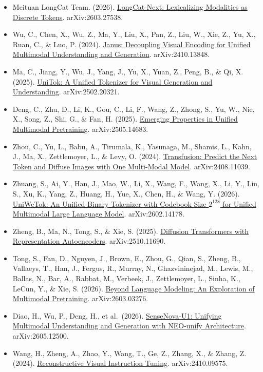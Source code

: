 \begin{itemize}
\tightlist
\item
  Meituan LongCat Team. (2026). \href{https://arxiv.org/abs/2603.27538}{LongCat-Next: Lexicalizing Modalities as Discrete Tokens}. arXiv:2603.27538.
\item
  Wu, C., Chen, X., Wu, Z., Ma, Y., Liu, X., Pan, Z., Liu, W., Xie, Z., Yu, X., Ruan, C., \& Luo, P. (2024). \href{https://arxiv.org/abs/2410.13848}{Janus: Decoupling Visual Encoding for Unified Multimodal Understanding and Generation}. arXiv:2410.13848.
\item
  Ma, C., Jiang, Y., Wu, J., Yang, J., Yu, X., Yuan, Z., Peng, B., \& Qi, X. (2025). \href{https://arxiv.org/abs/2502.20321}{UniTok: A Unified Tokenizer for Visual Generation and Understanding}. arXiv:2502.20321.
\item
  Deng, C., Zhu, D., Li, K., Gou, C., Li, F., Wang, Z., Zhong, S., Yu, W., Nie, X., Song, Z., Shi, G., \& Fan, H. (2025). \href{https://arxiv.org/abs/2505.14683}{Emerging Properties in Unified Multimodal Pretraining}. arXiv:2505.14683.
\item
  Zhou, C., Yu, L., Babu, A., Tirumala, K., Yasunaga, M., Shamis, L., Kahn, J., Ma, X., Zettlemoyer, L., \& Levy, O. (2024). \href{https://arxiv.org/abs/2408.11039}{Transfusion: Predict the Next Token and Diffuse Images with One Multi-Modal Model}. arXiv:2408.11039.
\item
  Zhuang, S., Ai, Y., Han, J., Mao, W., Li, X., Wang, F., Wang, X., Li, Y., Lin, S., Xu, K., Yang, Z., Huang, H., Yue, X., Chen, H., \& Wang, Y. (2026). \href{https://arxiv.org/abs/2602.14178}{UniWeTok: An Unified Binary Tokenizer with Codebook Size \(2^{128}\) for Unified Multimodal Large Language Model}. arXiv:2602.14178.
\item
  Zheng, B., Ma, N., Tong, S., \& Xie, S. (2025). \href{https://arxiv.org/abs/2510.11690}{Diffusion Transformers with Representation Autoencoders}. arXiv:2510.11690.
\item
  Tong, S., Fan, D., Nguyen, J., Brown, E., Zhou, G., Qian, S., Zheng, B., Vallaeys, T., Han, J., Fergus, R., Murray, N., Ghazvininejad, M., Lewis, M., Ballas, N., Bar, A., Rabbat, M., Verbeek, J., Zettlemoyer, L., Sinha, K., LeCun, Y., \& Xie, S. (2026). \href{https://arxiv.org/abs/2603.03276}{Beyond Language Modeling: An Exploration of Multimodal Pretraining}. arXiv:2603.03276.
\item
  Diao, H., Wu, P., Deng, H., et al.~(2026). \href{https://arxiv.org/abs/2605.12500}{SenseNova-U1: Unifying Multimodal Understanding and Generation with NEO-unify Architecture}. arXiv:2605.12500.
\item
  Wang, H., Zheng, A., Zhao, Y., Wang, T., Ge, Z., Zhang, X., \& Zhang, Z. (2024). \href{https://arxiv.org/abs/2410.09575}{Reconstructive Visual Instruction Tuning}. arXiv:2410.09575.
\end{itemize}

